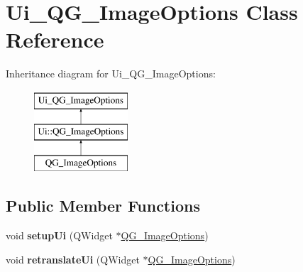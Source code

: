 \hypertarget{classUi__QG__ImageOptions}{\section{Ui\-\_\-\-Q\-G\-\_\-\-Image\-Options Class Reference}
\label{classUi__QG__ImageOptions}
}
Inheritance diagram for Ui\-\_\-\-Q\-G\-\_\-\-Image\-Options\-:\begin{figure}[H]
\begin{center}
\leavevmode
\includegraphics[height=3.000000cm]{classUi__QG__ImageOptions}
\end{center}
\end{figure}
\subsection*{Public Member Functions}
\begin{DoxyCompactItemize}
\item 
\hypertarget{classUi__QG__ImageOptions_a09d72e84c61ce81491344d76095221bf}{void {\bfseries setup\-Ui} (Q\-Widget $\ast$\hyperlink{classQG__ImageOptions}{Q\-G\-\_\-\-Image\-Options})}\label{classUi__QG__ImageOptions_a09d72e84c61ce81491344d76095221bf}

\item 
\hypertarget{classUi__QG__ImageOptions_ab9d83bea10a0c85eeb99acabf0eaa6a2}{void {\bfseries retranslate\-Ui} (Q\-Widget $\ast$\hyperlink{classQG__ImageOptions}{Q\-G\-\_\-\-Image\-Options})}\label{classUi__QG__ImageOptions_ab9d83bea10a0c85eeb99acabf0eaa6a2}

\end{DoxyCompactItemize}
